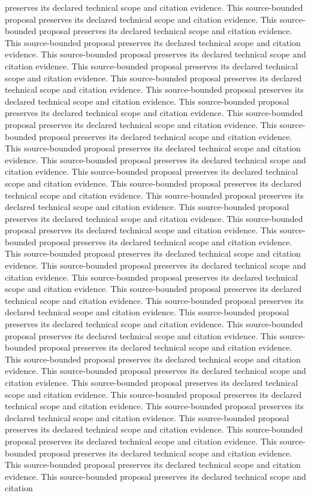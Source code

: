 \documentclass{article}
\begin{document}
preserves its declared technical scope and citation evidence. This source-bounded proposal preserves its declared technical scope and citation evidence. This source-bounded proposal preserves its declared technical scope and citation evidence. This source-bounded proposal preserves its declared technical scope and citation evidence. This source-bounded proposal preserves its declared technical scope and citation evidence. This source-bounded proposal preserves its declared technical scope and citation evidence. This source-bounded proposal preserves its declared technical scope and citation evidence. This source-bounded proposal preserves its declared technical scope and citation evidence. This source-bounded proposal preserves its declared technical scope and citation evidence. This source-bounded proposal preserves its declared technical scope and citation evidence. This source-bounded proposal preserves its declared technical scope and citation evidence. This source-bounded proposal preserves its declared technical scope and citation evidence. This source-bounded proposal preserves its declared technical scope and citation evidence. This source-bounded proposal preserves its declared technical scope and citation evidence. This source-bounded proposal preserves its declared technical scope and citation evidence. This source-bounded proposal preserves its declared technical scope and citation evidence. This source-bounded proposal preserves its declared technical scope and citation evidence. This source-bounded proposal preserves its declared technical scope and citation evidence. This source-bounded proposal preserves its declared technical scope and citation evidence. This source-bounded proposal preserves its declared technical scope and citation evidence. This source-bounded proposal preserves its declared technical scope and citation evidence. This source-bounded proposal preserves its declared technical scope and citation evidence. This source-bounded proposal preserves its declared technical scope and citation evidence. This source-bounded proposal preserves its declared technical scope and citation evidence. This source-bounded proposal preserves its declared technical scope and citation evidence. This source-bounded proposal preserves its declared technical scope and citation evidence. This source-bounded proposal preserves its declared technical scope and citation evidence. This source-bounded proposal preserves its declared technical scope and citation evidence. This source-bounded proposal preserves its declared technical scope and citation evidence. This source-bounded proposal preserves its declared technical scope and citation evidence. This source-bounded proposal preserves its declared technical scope and citation evidence. This source-bounded proposal preserves its declared technical scope and citation evidence. This source-bounded proposal preserves its declared technical scope and citation evidence. This source-bounded proposal preserves its declared technical scope and citation evidence. This source-bounded proposal preserves its declared technical scope and citation evidence. This source-bounded proposal preserves its declared technical scope and citation evidence. This source-bounded proposal preserves its declared technical scope and citation 
\end{document}

